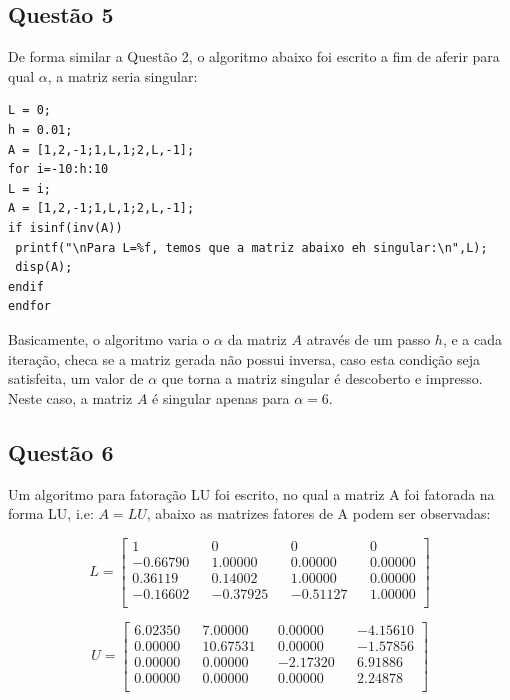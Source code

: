 \documentclass[a4paper, 11pt]{article}
\begin{document}
\subsection*{Questão 5}
De forma similar a Questão 2, o algoritmo abaixo foi escrito a fim de aferir para qual $\alpha$, a matriz seria singular:

\begin{lstlisting}
L = 0;
h = 0.01;
A = [1,2,-1;1,L,1;2,L,-1];
for i=-10:h:10
L = i;
A = [1,2,-1;1,L,1;2,L,-1];
if isinf(inv(A))
 printf("\nPara L=%f, temos que a matriz abaixo eh singular:\n",L);
 disp(A);
endif
endfor
\end{lstlisting}
Basicamente, o algoritmo varia o $\alpha$ da matriz $A$ através de um passo $h$, e a cada iteração, checa se a matriz gerada não possui inversa, caso esta condição seja satisfeita,
um valor de $\alpha$ que torna a matriz singular é descoberto e impresso. Neste caso, a matriz $A$ é singular apenas para $\alpha=6$.

\subsection*{Questão 6}
Um algoritmo para fatoração LU foi escrito, no qual a matriz A foi fatorada na forma LU, i.e: $A=LU$, abaixo as matrizes fatores de A podem ser observadas:

$$
L = \begin{bmatrix}
   1 && 0 && 0 && 0 \\
  -0.66790 &&  1.00000 && 0.00000  && 0.00000 \\
   0.36119 &&  0.14002 &&  1.00000 &&  0.00000 \\
  -0.16602 && -0.37925 && -0.51127 &&  1.00000 \\
\end{bmatrix}
$$


$$
U = \begin{bmatrix}
    6.02350  &&  7.00000   &&    0.00000   &&   -4.15610 \\
    0.00000   &&   10.67531  &&     0.00000   &&   -1.57856 \\
    0.00000  &&     0.00000   &&   -2.17320   &&    6.91886 \\
    0.00000   &&    0.00000   &&    0.00000   &&    2.24878 \\
\end{bmatrix}
$$
\end{document}
